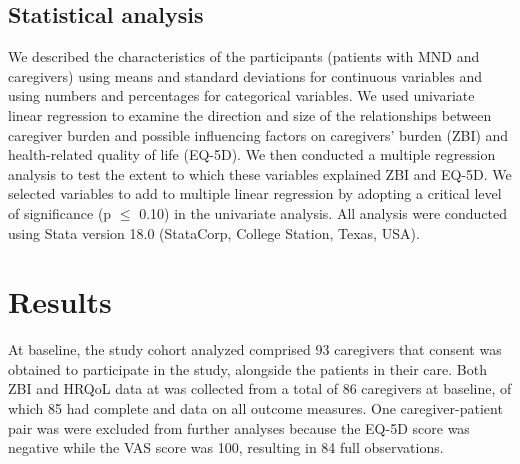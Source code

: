 \documentclass[12pt]{article}
\begin{document}
\subsection*{Statistical analysis}
We described the characteristics of the participants (patients with MND and caregivers) using means and standard deviations for continuous variables and using numbers and percentages for categorical variables. We used univariate linear regression to examine the direction and size of the relationships between caregiver burden and possible influencing factors on  caregivers’ burden (ZBI) and health-related quality of life (EQ-5D). We then conducted a multiple regression analysis to test the extent to which these variables explained ZBI and EQ-5D. We selected variables to add to multiple linear regression by adopting a critical level of significance (p $\leq$ 0.10) in the univariate analysis.
All analysis were conducted using Stata version 18.0 (StataCorp, College Station, Texas, USA).

\section*{Results}
At baseline, the study cohort analyzed comprised 93 caregivers that consent was obtained to participate in the study, alongside the patients in their care. Both ZBI and HRQoL data at was collected from a total of 86 caregivers at baseline, of which 85 had complete and data on all outcome measures. One caregiver-patient pair was were excluded from further analyses because the EQ-5D score was negative while the VAS score was 100, resulting in 84 full observations. %
\end{document}
